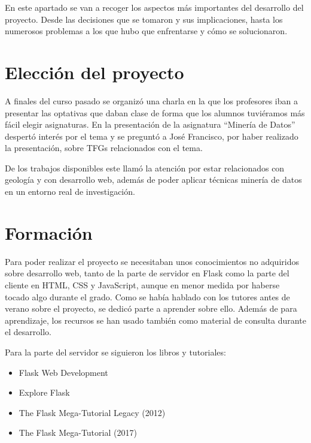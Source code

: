 
En este apartado se van a recoger los aspectos más importantes del desarrollo
del proyecto. Desde las decisiones que se tomaron y sus implicaciones,
hasta los numerosos problemas a los que hubo que enfrentarse y cómo se
solucionaron.

\section{Elección del proyecto}

A finales del curso pasado se organizó una charla en la que los profesores iban
a presentar las optativas que daban clase de forma que los alumnos tuviéramos
más fácil elegir asignaturas. En la presentación de la asignatura ``Minería de
Datos'' despertó interés por el tema y se preguntó a José Francisco, por haber
realizado la presentación, sobre TFGs relacionados con el tema.

De los trabajos disponibles este llamó la atención por estar relacionados con
geología y con desarrollo web, además de poder aplicar técnicas minería de datos
en un entorno real de investigación.

\section{Formación}

Para poder realizar el proyecto se necesitaban unos conocimientos no adquiridos
sobre desarrollo web, tanto de la parte de servidor en Flask como la parte del
cliente en HTML, CSS y JavaScript, aunque en menor medida por haberse tocado
algo durante el grado. Como se había hablado con los tutores antes de verano
sobre el proyecto, se dedicó parte a aprender sobre ello. Además de para
aprendizaje, los recursos se han usado también como material de consulta durante
el desarrollo.

\noindent Para la parte del servidor se siguieron los libros y tutoriales:
\begin{itemize}
	\item Flask Web Development~\cite{grinberg2014flask}
	\item Explore Flask~\cite{exploreflask}
	\item The Flask Mega-Tutorial Legacy (2012)~\cite{grinberg-mega-legacy}
	\item The Flask Mega-Tutorial (2017)~\cite{grinberg-mega}
\end{itemize}


